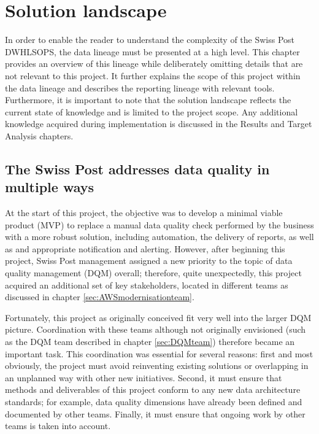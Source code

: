 \chapter{Solution landscape}
In order to enable the reader to understand the complexity of the Swiss Post \gls{DWHLSOPS}, the data lineage must be presented at a high level. This chapter provides an overview of this lineage while deliberately omitting details that are not relevant to this project. It further explains the scope of this project within the data lineage and describes the reporting lineage with relevant tools. Furthermore, it is important to note that the solution landscape reflects the current state of knowledge and is limited to the project scope. Any additional knowledge acquired during implementation is discussed in the Results and Target Analysis chapters.


\section{The Swiss Post addresses data quality in multiple ways}
\label{SolutionMultipleTeams}
At the start of this project, the objective was to develop a minimal viable product (\gls{MVP}) to replace a manual data quality check performed by the business with a more robust solution, including automation, the delivery of reports, as well as and appropriate notification and alerting. However, after beginning this project, Swiss Post management assigned a new priority to the topic of data quality management (\gls{DQM}) overall; therefore, quite unexpectedly, this project acquired an additional set of key stakeholders, located in different teams as discussed in chapter \ref{sec:AWSmodernisationteam}. 


Fortunately, this project as originally conceived fit very well into the larger \gls{DQM} picture.  Coordination with these teams although not originally envisioned (such as the DQM team described in chapter \ref{sec:DQMteam}) therefore became an important task. This coordination was essential for several reasons: first and most obviously,  the project must avoid reinventing existing solutions or overlapping in an unplanned way with other new initiatives. Second, it must ensure that methods and deliverables of this project conform to any new data architecture standards; for example, data quality dimensions have already been defined and documented by other teams. Finally, it must ensure that ongoing work by other teams is taken into account. 


